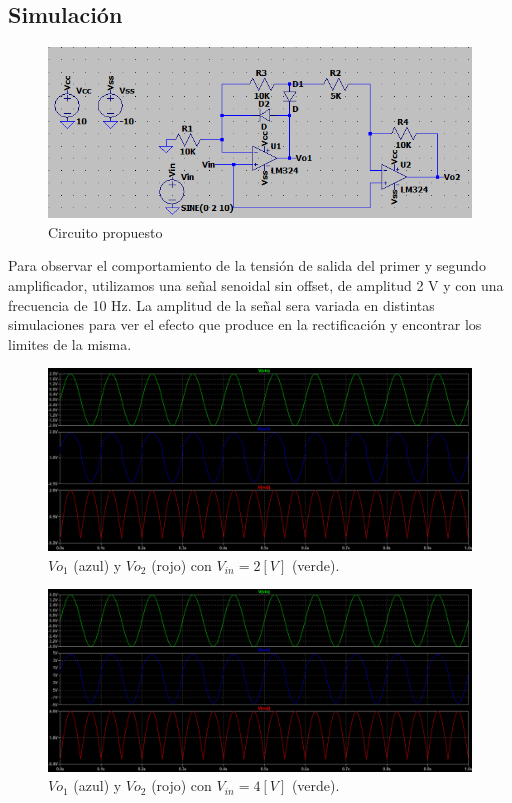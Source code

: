 \documentclass[11pt, a4paper]{article}
\begin{document}
\subsection{Simulación}
\begin{figure}[htb]
	\centering
	\includegraphics[width=1\textwidth]{Imagenes/Sim4.png}
	\caption{Circuito propuesto}
\end{figure}
Para observar el comportamiento de la tensión de salida del primer y segundo amplificador, utilizamos una señal senoidal sin offset, de amplitud 2 V y con una frecuencia de 10 Hz. La amplitud de la señal sera variada en distintas simulaciones para ver el efecto que produce en la rectificación y encontrar los limites de la misma.
\begin{figure}[H]
	\centering
	\includegraphics[width=1\textwidth]{Imagenes/Vin2V.png}
	\caption{$Vo_1$ (azul) y $Vo_2$ (rojo) con $V_{in}=2[V]$ (verde).}
\end{figure}
\begin{figure}[H]
	\centering
	\includegraphics[width=1\textwidth]{Imagenes/Vin4v.png}
	\caption{$Vo_1$ (azul) y $Vo_2$ (rojo) con $V_{in}=4[V]$ (verde).}
\end{figure}
\end{document}
